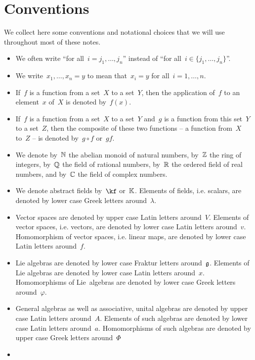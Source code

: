 \chapter{Conventions}

We collect here some conventions and notational choices that we will use throughout most of these notes.

\begin{itemize}
	\item
		We often write \enquote{for all~$i = j_1, \dotsc, j_n$} instead of \enquote{for all~$i \in \{ j_1, \dotsc, j_n \}$}.
	\item
		We write~$x_1, \dotsc, x_n = y$ to mean that~$x_i = y$ for all~$i = 1, \dotsc, n$.
	\item
		If~$f$ is a function from a set~$X$ to a set~$Y$, then the application of~$f$ to an element~$x$ of~$X$ is denoted by~$f(x)$.
	\item
		If~$f$ is a function from a set~$X$ to a set~$Y$ and~$g$ is a function from this set~$Y$ to a set~$Z$, then the composite of these two functions -- a function from~$X$ to~$Z$ -- is denoted by~$g \circ f$ or~$gf$.
	\item
		We denote by~$\mathbb{N}$ the abelian monoid of natural numbers, by~$\mathbb{Z}$ the ring of integers, by~$\mathbb{Q}$ the field of rational numbers, by~$\mathbb{R}$ the ordered field of real numbers, and by~$\mathbb{C}$ the field of complex numbers.
	\item
		We denote abstract fields by~$\kf$ or~$\mathbb{K}$.
		Elements of fields, i.e. scalars, are denoted by lower case Greek letters around~$\lambda$.
	\item
		Vector spaces are denoted by upper case Latin letters around~$V$.
		Elements of vector spaces, i.e. vectors, are denoted by lower case Latin letters around~$v$.
		Homomorphism of vector spaces, i.e. linear maps, are denoted by lower case Latin letters around~$f$.
	\item
		Lie algebras are denoted by lower case Fraktur letters around~$\mathfrak{g}$.
		Elements of Lie algebras are denoted by lower case Latin letters around~$x$.
		Homomorphisms of Lie~algebras are denoted by lower case Greek letters around~$\varphi$.
	\item
		General algebras as well as associative, unital algebras are denoted by upper case Latin letters around~$A$.
		Elements of such algebras are denoted by lower case Latin letters around~$a$.
		Homomorphisms of such algebras are denoted by upper case Greek letters around~$\Phi$
	\item

\end{itemize}
